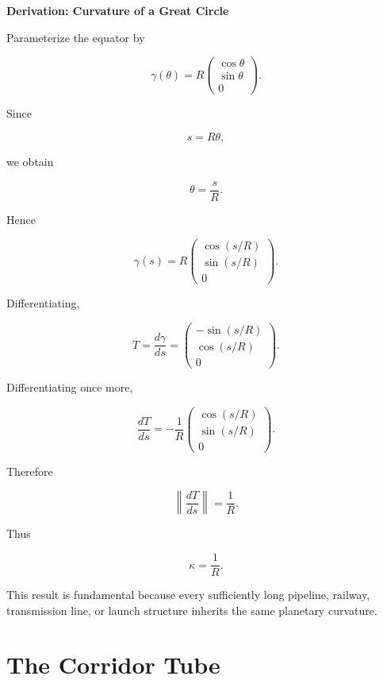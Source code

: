 \documentclass[11pt,fleqn]{book}
\numberwithin{equation}{chapter}
\newenvironment{derivation}[1]
  {\begin{derivationEnv}
   \noindent\textbf{Derivation: #1}\par\smallskip}
  {\end{derivationEnv}}
\theoremstyle{plain}
\theoremstyle{definition}
\theoremstyle{remark}
\begin{document}
\begin{derivation}{Curvature of a Great Circle}

Parameterize the equator by

\[
\gamma(\theta)
=
R
\begin{pmatrix}
\cos\theta\\
\sin\theta\\
0
\end{pmatrix}.
\]

Since

\[
s=R\theta,
\]

we obtain

\[
\theta=\frac{s}{R}.
\]

Hence

\[
\gamma(s)
=
R
\begin{pmatrix}
\cos(s/R)\\
\sin(s/R)\\
0
\end{pmatrix}.
\]

Differentiating,

\[
T
=
\frac{d\gamma}{ds}
=
\begin{pmatrix}
-\sin(s/R)\\
\cos(s/R)\\
0
\end{pmatrix}.
\]

Differentiating once more,

\[
\frac{dT}{ds}
=
-\frac1R
\begin{pmatrix}
\cos(s/R)\\
\sin(s/R)\\
0
\end{pmatrix}.
\]

Therefore

\[
\left\|
\frac{dT}{ds}
\right\|
=
\frac1R.
\]

Thus

\[
\boxed{\kappa=\frac1R.}
\]

\end{derivation}

This result is fundamental because every sufficiently long pipeline,
railway, transmission line, or launch structure inherits the same
planetary curvature.


\section{The Corridor Tube}
\end{document}
